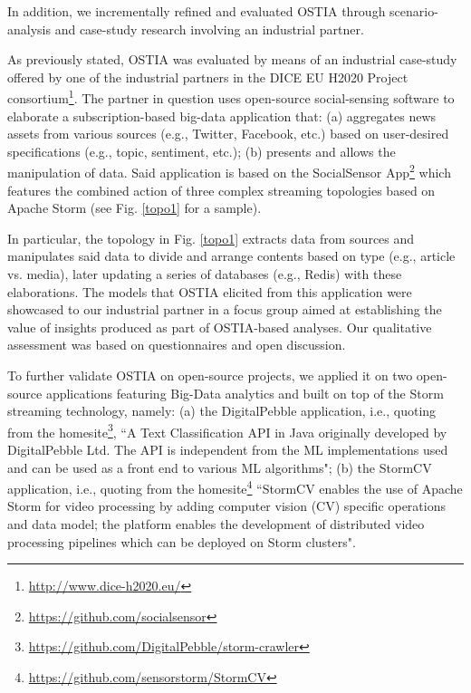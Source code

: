 In addition, we incrementally refined and evaluated OSTIA through scenario-analysis and case-study research \cite{casestudy} involving an industrial partner.

As previously stated, OSTIA was evaluated by means of an industrial case-study offered by one of the industrial partners in the DICE EU H2020 Project consortium\footnote{\url{http://www.dice-h2020.eu/}}. 
The partner in question uses open-source social-sensing software to elaborate a subscription-based big-data application that: (a) aggregates news assets from various sources (e.g., Twitter, Facebook, etc.) based on user-desired specifications (e.g., topic, sentiment, etc.); (b) presents and allows the manipulation of data. Said application is based on the SocialSensor App\footnote{\url{https://github.com/socialsensor}} which features the combined action of three complex streaming topologies based on Apache Storm (see Fig. \ref{topo1} for a sample).

In particular, the topology in Fig. \ref{topo1} extracts data from sources and manipulates said data to divide and arrange contents based on type (e.g., article vs. media), later updating a series of databases (e.g., Redis) with these elaborations. The models that OSTIA elicited from this application were showcased to our industrial partner in a focus group aimed at establishing the value of insights produced as part of OSTIA-based analyses. Our qualitative assessment was based on questionnaires and open discussion.

To further validate OSTIA on open-source projects, we applied it on two open-source applications featuring Big-Data analytics and built on top of the Storm streaming technology, namely: (a) the DigitalPebble application, i.e., quoting from the homesite\footnote{\url{https://github.com/DigitalPebble/storm-crawler}}, ``A Text Classification API in Java originally developed by DigitalPebble Ltd. The API is independent from the ML implementations used and can be used as a front end to various ML algorithms"; (b) the StormCV application, i.e., quoting from the homesite\footnote{\url{https://github.com/sensorstorm/StormCV}} ``StormCV enables the use of Apache Storm for video processing by adding computer vision (CV) specific operations and data model; the platform enables the development of distributed video processing pipelines which can be deployed on Storm clusters".


